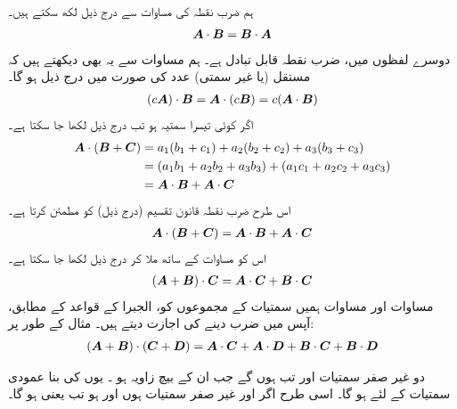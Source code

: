 ہم ضرب نقطہ کی مساوات  سے  درج ذیل لکھ سکتے ہیں۔
\begin{align}\label{مساوات_سمتیہ_قواعد_ضرب_نقطہ_الف}
{\ensuremath{{\boldsymbol{A}}}}\cdot{\ensuremath{{\boldsymbol{B}}}}={{\boldsymbol{B}}}\cdot{\ensuremath{{\boldsymbol{A}}}}
\end{align}
دوسرے لفظوں میں، ضرب نقطہ قابل تبادل ہے۔ ہم مساوات  سے  یہ بھی دیکھتے ہیں کہ مستقل (یا غیر سمتی) عدد  کی صورت میں درج ذیل ہو گا۔
\begin{align}\label{مساوات_سمتیہ_قواعد_ضرب_نقطہ_ب}
(c{{\boldsymbol{A}}})\cdot{\ensuremath{{\boldsymbol{B}}}}={{\boldsymbol{A}}}\cdot(c{{\boldsymbol{B}}})=c({{\boldsymbol{A}}}\cdot{\ensuremath{{\boldsymbol{B}}}})
\end{align}
اگر  کوئی تیسرا سمتیہ ہو تب درج ذیل لکھا جا سکتا ہے۔
\begin{align*}
{\ensuremath{{\boldsymbol{A}}}}\cdot({{\boldsymbol{B}}}+{{\boldsymbol{C}}})&=a_1(b_1+c_1)+a_2(b_2+c_2)+a_3(b_3+c_3)\\
&=(a_1b_1+a_2b_2+a_3b_3)+(a_1c_1+a_2c_2+a_3c_3)\\
&={{\boldsymbol{A}}}\cdot{\ensuremath{{\boldsymbol{B}}}}+{{\boldsymbol{A}}}\cdot{\ensuremath{{\boldsymbol{C}}}}
\end{align*}
اس طرح ضرب نقطہ قانون تقسیم (درج ذیل)  کو مطمئن کرتا ہے۔
\begin{align}\label{مساوات_سمتیہ_قواعد_ضرب_نقطہ_پ}
{\ensuremath{{\boldsymbol{A}}}}\cdot({{\boldsymbol{B}}}+{{\boldsymbol{C}}})={{\boldsymbol{A}}}\cdot{\ensuremath{{\boldsymbol{B}}}}+{{\boldsymbol{A}}}\cdot{\ensuremath{{\boldsymbol{C}}}}
\end{align}
اس کو مساوات  کے ساتھ ملا کر درج ذیل لکھا جا سکتا ہے۔
\begin{align}\label{مساوات_سمتیہ_قواعد_ضرب_نقطہ_ت}
({{\boldsymbol{A}}}+{{\boldsymbol{B}}})\cdot{\ensuremath{{\boldsymbol{C}}}}={{\boldsymbol{A}}}\cdot{\ensuremath{{\boldsymbol{C}}}}+{{\boldsymbol{B}}}\cdot{\ensuremath{{\boldsymbol{C}}}}
\end{align}
مساوات  اور مساوات  ہمیں سمتیات کے مجموعوں کو، الجبرا کے قواعد کے مطابق، آپس میں ضرب دینے کی اجازت دیتے ہیں۔ مثال کے طور پر:
\begin{align}\label{مساوات_سمتیہ_قواعد_ضرب_نقطہ_ٹ}
({{\boldsymbol{A}}}+{{\boldsymbol{B}}})\cdot({{\boldsymbol{C}}}+{{\boldsymbol{D}}})={{\boldsymbol{A}}}\cdot{\ensuremath{{\boldsymbol{C}}}}+{{\boldsymbol{A}}}\cdot{\ensuremath{{\boldsymbol{D}}}}+{{\boldsymbol{B}}}\cdot{\ensuremath{{\boldsymbol{C}}}}+{{\boldsymbol{B}}}\cdot{\ensuremath{{\boldsymbol{D}}}}
\end{align}

دو غیر صفر سمتیات  اور  تب  ہوں گے جب ان  کے بیچ زاویہ  ہو ۔ یوں  کی بنا عمودی سمتیات کے لئے  ہو گا۔ اسی طرح  اگر  اور  غیر صفر سمتیات ہوں اور  ہو تب  یعنی  ہو گا۔

